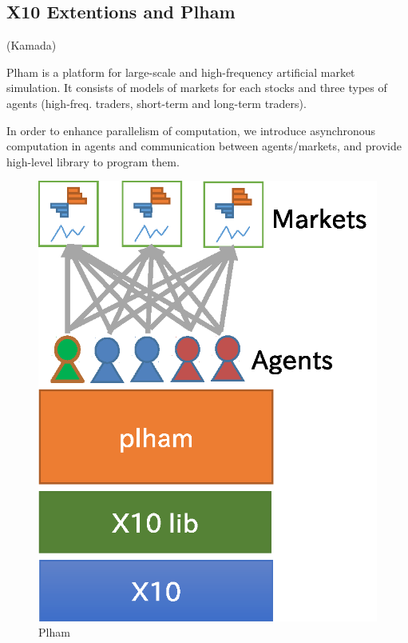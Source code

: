 \subsection{X10 Extentions and Plham}
\label{ss:X10 Extentions and Plham}
(Kamada)

Plham is a platform for large-scale and high-frequency artificial
market simulation.  It consists of models of markets for each stocks
and three types of agents (high-freq. traders, short-term and
long-term traders).

In order to enhance parallelism of computation, we introduce
asynchronous computation in agents and communication between
agents/markets, and provide high-level library to program them.

\begin{figure}
  \centering
  \includegraphics[width=.8\linewidth]{Figs.noda/figure-05.plham.eps}
  \caption{Plham}
  \label{fig:Figs.noda/figure-05.plham.eps}
\end{figure}


